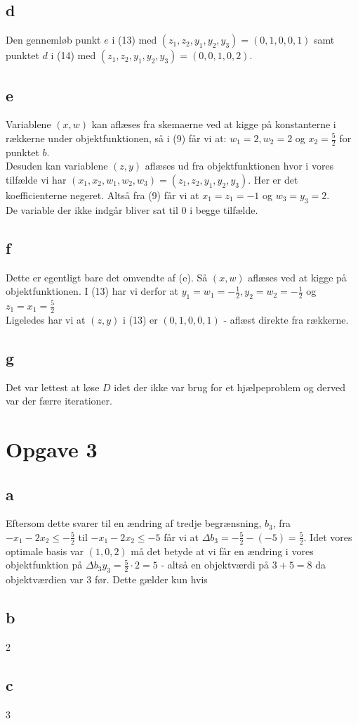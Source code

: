 \documentclass[12pt]{article}
\begin{document}
\subsection*{d}
Den gennemløb punkt $e$ i (13) med $(z_1,z_2,y_1,y_2,y_3)=(0,1,0,0,1)$ samt punktet $d$ i (14) med $(z_1,z_2,y_1,y_2,y_3)=(0,0,1,0,2)$.

\subsection*{e}
Variablene $(x,w)$ kan aflæses fra skemaerne ved at kigge på konstanterne i rækkerne under objektfunktionen, så i (9) får vi at: $w_1=2,w_2=2$ og $x_2=\frac{5}{2}$ for punktet $b$. \\
Desuden kan variablene $(z,y)$ aflæses ud fra objektfunktionen hvor i vores tilfælde vi har $(x_1,x_2,w_1,w_2,w_3)=(z_1,z_2,y_1,y_2,y_3)$. Her er det koefficienterne negeret. Altså fra (9) får vi at $x_1=z_1=-1$ og $w_3=y_3=2$. \\
De variable der ikke indgår bliver sat til $0$ i begge tilfælde.

\subsection*{f}
Dette er egentligt bare det omvendte af (e). Så $(x,w)$ aflæses ved at kigge på objektfunktionen. I (13) har vi derfor at $y_1=w_1=-\frac{1}{2},y_2=w_2=-\frac{1}{2}$ og $z_1=x_1=\frac{5}{2}$ \\
Ligeledes har vi at $(z,y)$ i (13) er $(0,1,0,0,1)$ - aflæst direkte fra rækkerne.

\subsection*{g}
Det var lettest at løse $D$ idet der ikke var brug for et hjælpeproblem og derved var der færre iterationer.

\section*{Opgave 3}
\subsection*{a}
Eftersom dette svarer til en ændring af tredje begrænsning, $b_3$, fra $-x_1-2x_2\leq -\frac{5}{2}$ til $-x_1-2x_2\leq -5$ får vi at $\Delta b_3= -\frac{5}{2}-(-5)=\frac{5}{2}$. Idet vores optimale basis var $(1,0,2)$ må det betyde at vi får en ændring i vores objektfunktion på $\Delta b_3y_3=\frac{5}{2}\cdot 2=5$ - altså en objektværdi på $3+5=8$ da objektværdien var $3$ før. Dette gælder kun hvis \\

\subsection*{b}
2

\subsection*{c}
3
\end{document}
